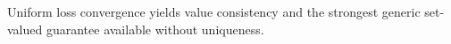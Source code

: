 Uniform loss convergence yields value consistency and the strongest generic set-valued guarantee available without uniqueness.